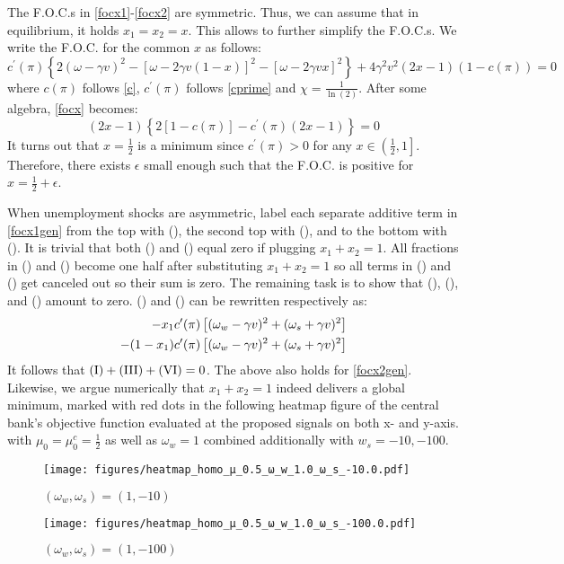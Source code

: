 \documentclass[12pt,a4paper]{article}
\newcommand{\RomanNumeralCaps}[1]{\MakeUppercase{\romannumeral #1}}
\begin{document}
The F.O.C.s in \eqref{focx1}-\eqref{focx2} are symmetric. Thus, we can assume that in equilibrium, it holds $x_1=x_2=x$. This allows to further simplify the F.O.C.s. We write the F.O.C. for the common $x$ as follows:
\begin{equation}
\label{focx}
c^\prime(\pi)\left\{2(\omega-\gamma v)^2-\left[\omega-2\gamma v\left(1-x\right)\right]^2-\left[\omega-2\gamma v x\right]^2\right\}+ 4\gamma^2 v^2(2x-1)(1-c(\pi))=0
\end{equation}
where $c(\pi)$ follows \eqref{c}, $c^\prime(\pi)$ follows \eqref{cprime} and $\chi=\frac{1}{\ln(2)}$. After some algebra, \eqref{focx} becomes:
\begin{equation}
(2x-1)\left\{2[1-c(\pi)]-c^\prime(\pi)(2x-1)\right\}=0
\end{equation}
It turns out that $x=\frac{1}{2}$ is a minimum since $c^\prime(\pi)>0$ for any $x\in \left(\frac{1}{2},1\right]$. Therefore, there exists $\epsilon$ small enough such that the F.O.C. is positive for $x=\frac{1}{2}+\epsilon$.

When unemployment shocks are asymmetric, label each separate additive term in \eqref{focx1gen} from the top with (\RomanNumeralCaps{1}), the second top with (\RomanNumeralCaps{2}), and to the bottom with (\RomanNumeralCaps{7}). It is trivial that both (\RomanNumeralCaps{4}) and (\RomanNumeralCaps{7}) equal zero if plugging $x_1+x_2=1$. All fractions in (\RomanNumeralCaps{2}) and (\RomanNumeralCaps{5}) become one half after substituting $x_1+x_2=1$ so all terms in (\RomanNumeralCaps{2}) and (\RomanNumeralCaps{5}) get canceled out so their sum is zero. The remaining task is to show that  (\RomanNumeralCaps{1}), (\RomanNumeralCaps{3}), and (\RomanNumeralCaps{6}) amount to zero. (\RomanNumeralCaps{3}) and (\RomanNumeralCaps{6}) can be rewritten respectively as:
    \begin{align}
        \small 
        -x_1c^\prime(\pi)\left[(\omega_w-\gamma v)^2+(\omega_s+\gamma v)^2\right] \\
        -(1-x_1)c^\prime(\pi)\left[(\omega_w-\gamma v)^2+(\omega_s+\gamma v)^2\right]
    \end{align}
    It follows that $\mbox{(\RomanNumeralCaps{1})}+\mbox{(\RomanNumeralCaps{3})}+\mbox{(\RomanNumeralCaps{6})}=0$. The above also holds for \eqref{focx2gen}. Likewise, we argue numerically that $x_1+x_2=1$ indeed delivers a global minimum, marked with red dots in the following heatmap figure of the central bank's objective function evaluated at the proposed signals on both x- and y-axis. with $\mu_0=\mu_0^c=\frac{1}{2}$ as well as $\omega_w=1$ combined additionally with $w_s=-10,-100$.
    \begin{figure}[htp!]
    \caption{$(\omega_w,\omega_s)=(1,-10)$}
    \centering
    \texttt{[image: figures/heatmap\_homo\_μ\_0.5\_ω\_w\_1.0\_ω\_s\_-10.0.pdf]}
    \end{figure}
    \begin{figure}[htp!]
    \caption{$(\omega_w,\omega_s)=(1,-100)$}
    \centering
    \texttt{[image: figures/heatmap\_homo\_μ\_0.5\_ω\_w\_1.0\_ω\_s\_-100.0.pdf]}
    \end{figure}
\end{document}
